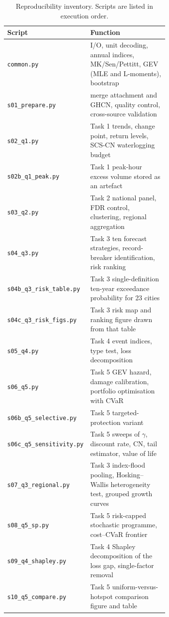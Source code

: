 \begin{table}[H]
\centering
\caption{Reproducibility inventory. Scripts are listed in execution order.}
\footnotesize
\setlength{\tabcolsep}{4pt}
\begin{tabular}{@{}lp{0.66\linewidth}@{}}
\toprule
Script & Function\\
\midrule
\texttt{common.py} & I/O, unit decoding, annual indices, MK/Sen/Pettitt, GEV (MLE and L-moments), bootstrap\\
\texttt{s01\_prepare.py} & merge attachment and GHCN, quality control, cross-source validation\\
\texttt{s02\_q1.py} & Task 1 trends, change point, return levels, SCS-CN waterlogging budget\\
\texttt{s02b\_q1\_peak.py} & Task 1 peak-hour excess volume stored as an artefact\\
\texttt{s03\_q2.py} & Task 2 national panel, FDR control, clustering, regional aggregation\\
\texttt{s04\_q3.py} & Task 3 ten forecast strategies, record-breaker identification, risk ranking\\
\texttt{s04b\_q3\_risk\_table.py} & Task 3 single-definition ten-year exceedance probability for 23 cities\\
\texttt{s04c\_q3\_risk\_figs.py} & Task 3 risk map and ranking figure drawn from that table\\
\texttt{s05\_q4.py} & Task 4 event indices, type test, loss decomposition\\
\texttt{s06\_q5.py} & Task 5 GEV hazard, damage calibration, portfolio optimisation with CVaR\\
\texttt{s06b\_q5\_selective.py} & Task 5 targeted-protection variant\\
\texttt{s06c\_q5\_sensitivity.py} & Task 5 sweeps of $\gamma$, discount rate, CN, tail estimator, value of life\\
\texttt{s07\_q3\_regional.py} & Task 3 index-flood pooling, Hosking--Wallis heterogeneity test, grouped growth curves\\
\texttt{s08\_q5\_sp.py} & Task 5 risk-capped stochastic programme, cost--CVaR frontier\\
\texttt{s09\_q4\_shapley.py} & Task 4 Shapley decomposition of the loss gap, single-factor removal\\
\texttt{s10\_q5\_compare.py} & Task 5 uniform-versus-hotspot comparison figure and table\\
\bottomrule
\end{tabular}
\end{table}

